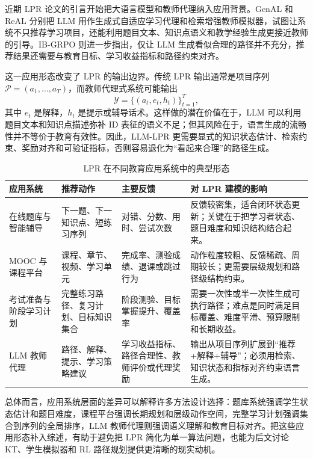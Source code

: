 \documentclass[UTF8,a4paper,zihao=-4]{ctexart}
\begin{document}
近期 LPR 论文的引言开始把大语言模型和教师代理纳入应用背景。GenAL 和 ReAL 分别把 LLM 用作生成式自适应学习代理和检索增强教师模拟器，试图让系统不只推荐学习项目，还能利用题目文本、知识点语义和教学经验生成更接近教师的引导\cite{Lv2025GenAL,Lv2025ReAL}。IB-GRPO 则进一步指出，仅让 LLM 生成看似合理的路径并不充分，推荐结果还需要与教育目标、学习收益指标和路径约束对齐\cite{Wang2026IBGRPO}。

这一应用形态改变了 LPR 的输出边界。传统 LPR 输出通常是项目序列 $\mathcal{P}=(a_1,\ldots,a_T)$，而教师代理式系统可能输出
\begin{equation}
\mathcal{Y}=\{(a_t,e_t,h_t)\}_{t=1}^{T},
\end{equation}
其中 $e_t$ 是解释，$h_t$ 是提示或辅导话术。这样做的潜在价值在于，LLM 可以利用题目文本和知识点描述弥补 ID 表征的语义不足；但其风险在于，语言生成的流畅性并不等价于教育有效性。因此，LLM-LPR 更需要显式的知识状态估计、检索约束、奖励对齐和可验证指标，否则容易退化为“看起来合理”的路径生成。

\begin{table}[t]
\centering
\caption{LPR 在不同教育应用系统中的典型形态}
\label{tab:lpr-applications}
\small
\begin{tabularx}{\textwidth}{p{2.5cm}p{2.8cm}p{2.8cm}X}
\toprule
应用系统 & 推荐动作 & 主要反馈 & 对 LPR 建模的影响 \\
\midrule
在线题库与智能辅导 & 下一题、下一知识点、短练习序列 & 对错、分数、用时、尝试次数 & 反馈较密集，适合闭环状态更新；关键在于把学习者状态、题目难度和知识结构结合起来\cite{Liu2019CSEAL,Zhang2024DLPR}。\\
MOOC 与课程平台 & 课程、章节、视频、学习单元 & 完成率、测验成绩、退课或跳过行为 & 动作粒度较粗、反馈稀疏、周期较长；更需要层级规划和路径级结构约束\cite{Zhang2019MOOC,Yu2025LIGHT,Chen2023SRC}。\\
考试准备与阶段学习计划 & 完整练习路径、复习计划、目标知识集合 & 阶段测验、目标掌握提升、覆盖率 & 需要一次性或半一次性生成可执行路径；难点是同时满足目标覆盖、难度平滑、预算限制和长期收益\cite{Chen2023SRC,Peng2026UNO,Cheng2026UniER}。\\
LLM 教师代理 & 路径、解释、提示、学习策略建议 & 学习收益指标、路径合理性、教师评价或代理奖励 & 输出从项目序列扩展到“推荐+解释+辅导”；必须用检索、知识状态和指标对齐约束语言生成\cite{Lv2025GenAL,Lv2025ReAL,Wang2026IBGRPO}。\\
\bottomrule
\end{tabularx}
\end{table}

总体而言，应用系统层面的差异可以解释许多方法设计选择：题库系统强调学生状态估计和题目难度，课程平台强调长期规划和层级动作空间，完整学习计划强调集合到序列的全局排序，LLM 教师代理则强调语义理解和教育目标对齐。把这些应用形态补入综述，有助于避免把 LPR 简化为单一算法问题，也能为后文讨论 KT、学生模拟器和 RL 路径规划提供更清晰的现实动机。
\end{document}
